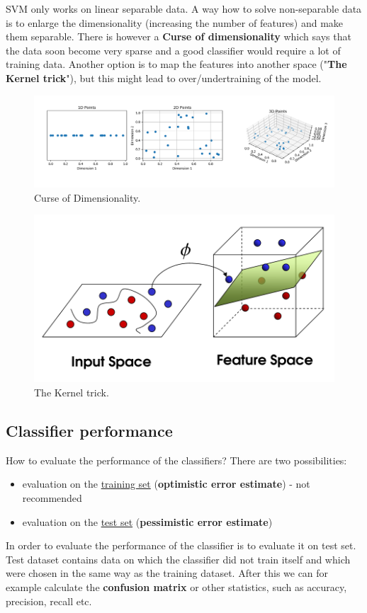 SVM only works on linear separable data. A way how to solve non-separable data is to enlarge the dimensionality (increasing the number of features) and make them separable. There is however a \textbf{Curse of dimensionality} which says that the data soon become very sparse and a good classifier would require a lot of training data. Another option is to map the features into another space ("\textbf{The Kernel trick}"), but this might lead to over/undertraining of the model.
\begin{figure}[h]
	\centering
	\includegraphics[scale=0.55]{Curse.png}
	\caption{Curse of Dimensionality.}
\end{figure}
\begin{figure}[h]
	\centering
	\includegraphics[scale=0.3]{KernelTrick.png}
	\caption{The Kernel trick.}
\end{figure}
\vspace{2cm}

\subsection{Classifier performance}
How to evaluate the performance of the classifiers? There are two possibilities:
\begin{itemize}
	\item evaluation on the \underline{training set} (\textbf{optimistic error estimate}) - not recommended
	\item evaluation on the \underline{test set} (\textbf{pessimistic error estimate})
\end{itemize}
In order to evaluate the performance of the classifier is to evaluate it on test set. Test dataset contains data on which the classifier did not train itself and which were chosen in the same way as the training dataset. After this we can for example calculate the \textbf{confusion matrix} or other statistics, such as accuracy, precision, recall etc. 

